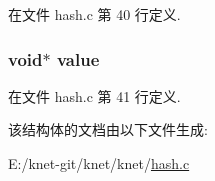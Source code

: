 在文件 hash.\+c 第 40 行定义.

\hypertarget{struct__hash__value__t_a0f61d63b009d0880a89c843bd50d8d76}{}
\subsubsection[{value}]{\setlength{\rightskip}{0pt plus 5cm}void$\ast$ value}\label{struct__hash__value__t_a0f61d63b009d0880a89c843bd50d8d76}


在文件 hash.\+c 第 41 行定义.



该结构体的文档由以下文件生成\+:\begin{DoxyCompactItemize}
\item 
E\+:/knet-\/git/knet/knet/\hyperlink{hash_8c}{hash.\+c}\end{DoxyCompactItemize}
